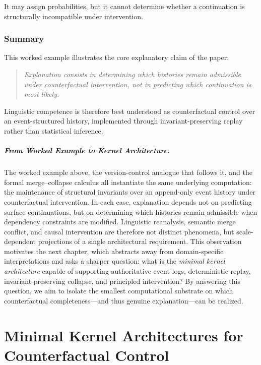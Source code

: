 \documentclass[11pt]{article}
\begin{document}
It may assign probabilities, but it cannot determine whether a continuation is structurally incompatible under intervention.

\subsection{Summary}

This worked example illustrates the core explanatory claim of the paper:

\begin{quote}
\emph{Explanation consists in determining which histories remain admissible under counterfactual intervention, not in predicting which continuation is most likely.}
\end{quote}

Linguistic competence is therefore best understood as counterfactual control over an event-structured history, implemented through invariant-preserving replay rather than statistical inference.

\paragraph{From Worked Example to Kernel Architecture.}
The worked example above, the version-control analogue that follows it, and the formal merge--collapse calculus all instantiate the same underlying computation: the maintenance of structural invariants over an append-only event history under counterfactual intervention. In each case, explanation depends not on predicting surface continuations, but on determining which histories remain admissible when dependency constraints are modified. Linguistic reanalysis, semantic merge conflict, and causal intervention are therefore not distinct phenomena, but scale-dependent projections of a single architectural requirement. This observation motivates the next chapter, which abstracts away from domain-specific interpretations and asks a sharper question: what is the \emph{minimal kernel architecture} capable of supporting authoritative event logs, deterministic replay, invariant-preserving collapse, and principled intervention? By answering this question, we aim to isolate the smallest computational substrate on which counterfactual completeness—and thus genuine explanation—can be realized.

\chapter{Minimal Kernel Architectures for Counterfactual Control}
\label{ch:minimal_kernel}
\end{document}
